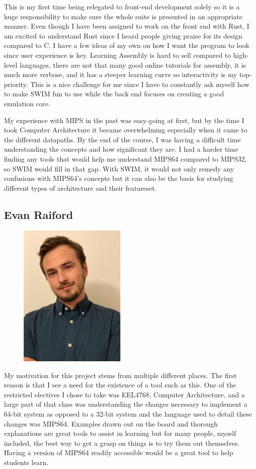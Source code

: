 \documentclass[parskip=half, fontsize=12pt]{scrartcl}
\begin{document}
This is my first time being relegated to front-end development solely so it is a huge responsibility to make sure the whole suite is presented in an appropriate manner. Even though I have been assigned to work on the front end with Rust, I am excited to understand Rust since I heard people giving praise for its design compared to C. I have a few ideas of my own on how I want the program to look since user experience is key. Learning Assembly is hard to sell compared to high-level languages, there are not that many good online tutorials for assembly, it is much more verbose, and it has a steeper learning curve so interactivity is my top-priority. This is a nice challenge for me since I have to constantly ask myself how to make SWIM fun to use while the back end focuses on creating a good emulation core.

My experience with MIPS in the past was easy-going at first, but by the time I took Computer Architecture it became overwhelming especially when it came to the different datapaths. By the end of the course, I was having a difficult time understanding the concepts and how significant they are. I had a harder time finding any tools that would help me understand MIPS64 compared to MIPS32, so SWIM would fill in that gap. With SWIM, it would not only remedy any confusions with MIPS64's concepts but it can also be the basis for studying different types of architecture and their featureset.


\subsection{Evan Raiford}
\begin{figure}[H]
    \includegraphics[height=7cm]{profile-evan}
\end{figure}

My motivation for this project stems from multiple different places. The first reason is that I see a need for the existence of a tool such as this. One of the restricted electives I chose to take was EEL4768, Computer Architecture, and a large part of that class was understanding the changes necessary to implement a 64-bit system as opposed to a 32-bit system and the language used to detail these changes was MIPS64. Examples drawn out on the board and thorough explanations are great tools to assist in learning but for many people, myself included, the best way to get a grasp on things is to try them out themselves. Having a version of MIPS64 readily accessible would be a great tool to help students learn.
\end{document}
